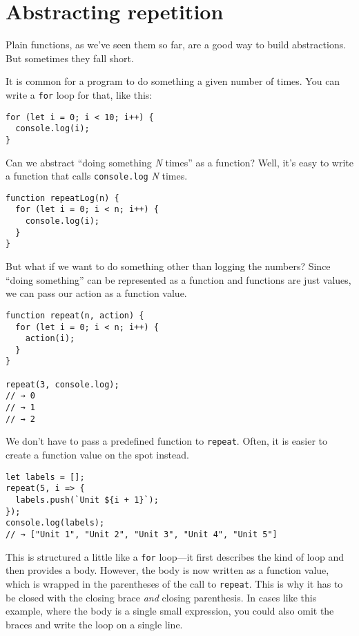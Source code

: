 \section{Abstracting repetition}

Plain functions, as we've seen them so far, are a good way to build abstractions. But sometimes they fall short.

It is common for a program to do something a given number of times. You can write a \lstinline`for` loop for that, like this:

\begin{lstlisting}
for (let i = 0; i < 10; i++) {
  console.log(i);
}
\end{lstlisting}
\noindent

Can we abstract ``doing something \emph{N} times'' as a function? Well, it's easy to write a function that calls \lstinline`console.log` \emph{N} times.

\begin{lstlisting}
function repeatLog(n) {
  for (let i = 0; i < n; i++) {
    console.log(i);
  }
}
\end{lstlisting}
\noindent{}

But what if we want to do something other than logging the numbers? Since ``doing something'' can be represented as a function and functions are just values, we can pass our action as a function value.

\begin{lstlisting}
function repeat(n, action) {
  for (let i = 0; i < n; i++) {
    action(i);
  }
}

repeat(3, console.log);
// → 0
// → 1
// → 2
\end{lstlisting}
\noindent

We don't have to pass a predefined function to \lstinline`repeat`. Often, it is easier to create a function value on the spot instead.

\begin{lstlisting}
let labels = [];
repeat(5, i => {
  labels.push(`Unit ${i + 1}`);
});
console.log(labels);
// → ["Unit 1", "Unit 2", "Unit 3", "Unit 4", "Unit 5"]
\end{lstlisting}
\noindent{}

This is structured a little like a \lstinline`for` loop—it first describes the kind of loop and then provides a body. However, the body is now written as a function value, which is wrapped in the parentheses of the call to \lstinline`repeat`. This is why it has to be closed with the closing brace \emph{and} closing parenthesis. In cases like this example, where the body is a single small expression, you could also omit the braces and write the loop on a single line.

